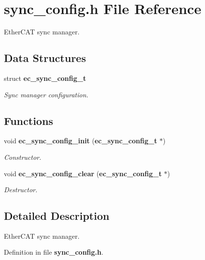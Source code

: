 \section{sync\-\_\-config.\-h \-File \-Reference}
\label{sync__config_8h}


\-Ether\-C\-A\-T sync manager.  


\subsection*{\-Data \-Structures}
\begin{DoxyCompactItemize}
\item 
struct {\bf ec\-\_\-sync\-\_\-config\-\_\-t}
\begin{DoxyCompactList}\small\item\em \-Sync manager configuration. \end{DoxyCompactList}\end{DoxyCompactItemize}
\subsection*{\-Functions}
\begin{DoxyCompactItemize}
\item 
void {\bf ec\-\_\-sync\-\_\-config\-\_\-init} ({\bf ec\-\_\-sync\-\_\-config\-\_\-t} $\ast$)\label{sync__config_8h_a7a8aef074c9e63236438779f47342406}

\begin{DoxyCompactList}\small\item\em \-Constructor. \end{DoxyCompactList}\item 
void {\bf ec\-\_\-sync\-\_\-config\-\_\-clear} ({\bf ec\-\_\-sync\-\_\-config\-\_\-t} $\ast$)\label{sync__config_8h_aa601ea25957e293659f5ab2512beeab9}

\begin{DoxyCompactList}\small\item\em \-Destructor. \end{DoxyCompactList}\end{DoxyCompactItemize}


\subsection{\-Detailed \-Description}
\-Ether\-C\-A\-T sync manager. 

\-Definition in file {\bf sync\-\_\-config.\-h}.

